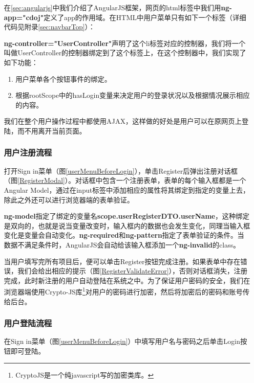 在\ref{sec:angularjs}中我们介绍了AngularJS框架，网页的html标签中我们用\textbf{ng-app="cdoj"}定义了app的作用域。在HTML中用户菜单只有如下一个标签（详细代码见附录\ref{sec:navbarTop}）：



\textbf{ng-controller="UserController"}声明了这个li标签对应的控制器，我们将一个叫做UserController的控制器绑定到了这个标签上，在这个控制器中，我们实现了如下功能：
\begin{enumerate}
	\item 用户菜单各个按钮事件的绑定。
	\item 根据rootScope中的hasLogin变量来决定用户的登录状况以及根据情况展示相应的内容。
\end{enumerate}

我们在整个用户操作过程中都使用AJAX，这样做的好处是用户可以在原网页上登陆，而不用离开当前页面。

\subsubsection{用户注册流程}
打开Sign in菜单（图\ref{userMenuBeforeLogin}），单击Register后弹出注册对话框（图\ref{RegisterModal}）。对话框中包含一个注册表单，表单的每个输入框都是一个Angular Model，通过在input标签中添加相应的属性将其绑定到指定的变量上去，除此之外还可以进行浏览器端的表单验证。




\textbf{ng-model}指定了绑定的变量名\textbf{scope.userRegisterDTO.userName}，这种绑定是双向的，也就是说当变量改变时，输入框内的数据也会发生变化，同理当输入框变化是变量会自动变化。\textbf{ng-required}和\textbf{ng-pattern}指定了表单验证的条件。当数据不满足条件时，AngularJS会自动给该输入框添加一个\textbf{ng-invalid}的class。

当用户填写完所有项目后，便可以单击Register按钮完成注册。如果表单中存在错误，我们会给出相应的提示（图\ref{RegisterValidateError}），否则对话框消失，注册完成，此时新注册的用户自动登陆在系统之中。为了保证用户密码的安全，我们在浏览器端使用Crypto-JS库\footnote{CryptoJS是一个纯javascript写的加密类库。}对用户的密码进行加密，然后将加密后的密码和账号传给后台。


\subsubsection{用户登陆流程}
在Sign in菜单（图\ref{userMenuBeforeLogin}）中填写用户名与密码之后单击Login按钮即可登陆。

